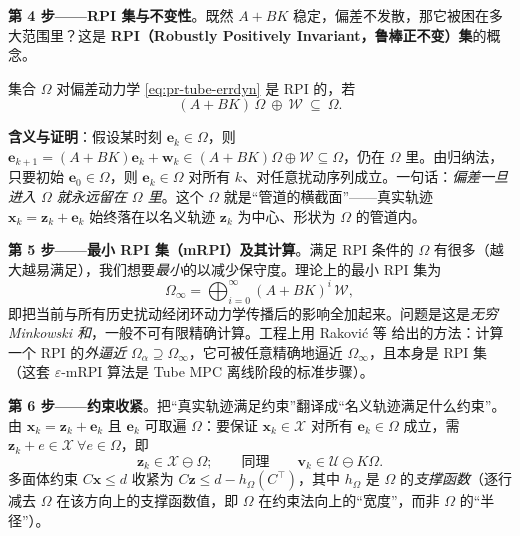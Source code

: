 \textbf{第 4 步——RPI 集与不变性}。既然 $A+BK$ 稳定，偏差不发散，那它被困在多大范围里？这是 \textbf{RPI（Robustly Positively Invariant，鲁棒正不变）集}的概念。
\begin{definition}[RPI 集]\label{def:pr-rpi}
集合 $\Omega$ 对偏差动力学 \cref{eq:pr-tube-errdyn} 是 RPI 的，若
\begin{equation}
  (A+BK)\,\Omega\ \oplus\ \mathcal{W}\ \subseteq\ \Omega.
  \label{eq:pr-rpi-cond}
\end{equation}
\end{definition}
\textbf{含义与证明}：假设某时刻 $\mathbf{e}_k\in\Omega$，则 $\mathbf{e}_{k+1}=(A+BK)\mathbf{e}_k+\mathbf{w}_k\in(A+BK)\Omega\oplus\mathcal{W}\subseteq\Omega$，仍在 $\Omega$ 里。由归纳法，只要初始 $\mathbf{e}_0\in\Omega$，则 $\mathbf{e}_k\in\Omega$ 对所有 $k$、对任意扰动序列成立。一句话：\emph{偏差一旦进入 $\Omega$ 就永远留在 $\Omega$ 里}。这个 $\Omega$ 就是“管道的横截面”——真实轨迹 $\mathbf{x}_k=\mathbf{z}_k+\mathbf{e}_k$ 始终落在以名义轨迹 $\mathbf{z}_k$ 为中心、形状为 $\Omega$ 的管道内。

\textbf{第 5 步——最小 RPI 集（mRPI）及其计算}。满足 RPI 条件的 $\Omega$ 有很多（越大越易满足），我们想要\emph{最小}的以减少保守度。理论上的最小 RPI 集为
\begin{equation}
  \Omega_\infty=\bigoplus_{i=0}^{\infty}(A+BK)^i\,\mathcal{W},
  \label{eq:pr-mrpi}
\end{equation}
即把当前与所有历史扰动经闭环动力学传播后的影响全加起来。问题是这是\emph{无穷 Minkowski 和}，一般不可有限精确计算。工程上用 Raković 等\cite{rakovic2005invariant} 给出的方法：计算一个 RPI 的\emph{外逼近} $\Omega_\alpha\supseteq\Omega_\infty$，它可被任意精确地逼近 $\Omega_\infty$，且本身是 RPI 集（这套 $\varepsilon$-mRPI 算法是 Tube MPC 离线阶段的标准步骤）。

\textbf{第 6 步——约束收紧}。把“真实轨迹满足约束”翻译成“名义轨迹满足什么约束”。由 $\mathbf{x}_k=\mathbf{z}_k+\mathbf{e}_k$ 且 $\mathbf{e}_k$ 可取遍 $\Omega$：要保证 $\mathbf{x}_k\in\mathcal{X}$ 对所有 $\mathbf{e}_k\in\Omega$ 成立，需 $\mathbf{z}_k+e\in\mathcal{X}\ \forall e\in\Omega$，即
\begin{equation}
  \mathbf{z}_k\in\mathcal{X}\ominus\Omega;
  \qquad\text{同理}\qquad
  \mathbf{v}_k\in\mathcal{U}\ominus K\Omega.
  \label{eq:pr-tube-tighten}
\end{equation}
多面体约束 $C\mathbf{x}\le d$ 收紧为 $C\mathbf{z}\le d-h_\Omega(C^\top)$，其中 $h_\Omega$ 是 $\Omega$ 的\emph{支撑函数}（逐行减去 $\Omega$ 在该方向上的支撑函数值，即 $\Omega$ 在约束法向上的“宽度”，而非 $\Omega$ 的“半径”）。

